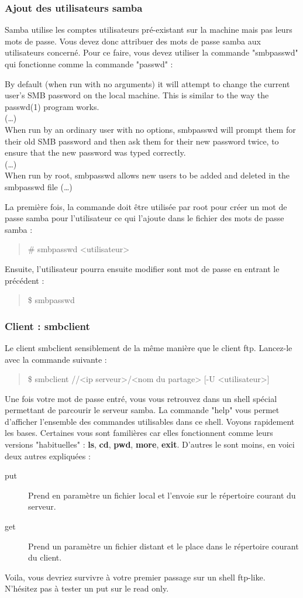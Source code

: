 \documentclass[a4paper,11pt]{article}
\newcommand{\commande}[1] {
    \begin{quote}
    \tt\raggedright #1 
    \end{quote}
}
\newcommand{\man}[2]{
    \begin{tcolorbox}[toprule=3mm,width=\textwidth,outer arc=0mm,colbacktitle=grayman,coltitle=black,colback={grayman},colframe={grayman},title={man : \tt #1}]
        \tt\raggedright #2
    \end{tcolorbox}
}
\begin{document}
\subsubsection{Ajout des utilisateurs samba}
\par Samba utilise les comptes utilisateurs pré-existant sur la machine mais pas leurs mots de passe. Vous devez donc attribuer des mots de passe samba aux utilisateurs concerné. Pour ce faire, vous devez utiliser la commande "smbpasswd" qui fonctionne comme la commande "passwd" :
\man{smbpasswd}{
By default (when run with no arguments) it will attempt to change the current user's SMB password on the local machine. This is similar to the way the passwd(1) program works.\\
(\dots)\\
When run by an ordinary user with no options, smbpasswd will prompt them for their old SMB password and then ask them for their new password twice, to ensure that the new password was typed correctly.\\
(\dots)\\
When run by root, smbpasswd allows new users to be added and deleted in the smbpasswd file (\dots)\\
}
\par La première fois, la commande doit être utilisée par root pour créer un mot de passe samba pour l'utilisateur ce qui l'ajoute dans le fichier des mots de passe samba :
\commande{\# smbpasswd <utilisateur>}
\par Ensuite, l'utilisateur pourra ensuite modifier sont mot de passe en entrant le précédent :
\commande{\$ smbpasswd}

\subsubsection{Client : smbclient}
\par Le client smbclient sensiblement de la même manière que le client ftp. Lancez-le avec la commande suivante :
\commande{\$ smbclient //<ip serveur>/<nom du partage> [-U <utilisateur>]}
\par Une fois votre mot de passe entré, vous vous retrouvez dans un shell spécial permettant de parcourir le serveur samba. La commande "help" vous permet d'afficher l'ensemble des commandes utilisables dans ce shell. Voyons rapidement les bases. Certaines vous sont familières car elles fonctionnent comme leurs versions "habituelles" : \textbf{ls}, \textbf{cd}, \textbf{pwd}, \textbf{more}, \textbf{exit}. D'autres le sont moins, en voici deux autres expliquées :
\begin{description}
\item[put] Prend en paramètre un fichier local et l'envoie sur le répertoire courant du serveur.
\item[get] Prend un paramètre un fichier distant et le place dans le répertoire courant du client.
\end{description}
\par Voila, vous devriez survivre à votre premier passage sur un shell ftp-like. N'hésitez pas à tester un put sur le read only.
\end{document}
